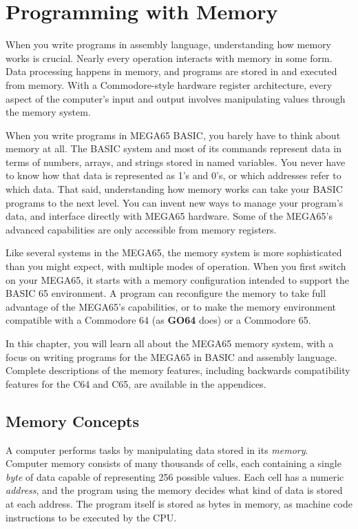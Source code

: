 
\chapter{Programming with Memory}
\label{cha:programming-with-memory}

When you write programs in assembly language, understanding how memory works is crucial. Nearly every operation interacts with memory in some form. Data processing happens in memory, and programs are stored in and executed from memory. With a Commodore-style hardware register architecture, every aspect of the computer's input and output involves manipulating values through the memory system.

When you write programs in MEGA65 BASIC, you barely have to think about memory at all. The BASIC system and most of its commands represent data in terms of numbers, arrays, and strings stored in named variables. You never have to know how that data is represented as 1's and 0's, or which addresses refer to which data. That said, understanding how memory works can take your BASIC programs to the next level. You can invent new ways to manage your program's data, and interface directly with MEGA65 hardware. Some of the MEGA65's advanced capabilities are only accessible from memory registers.

Like several systems in the MEGA65, the memory system is more sophisticated than you might expect, with multiple modes of operation. When you first switch on your MEGA65, it starts with a memory configuration intended to support the BASIC 65 environment. A program can reconfigure the memory to take full advantage of the MEGA65's capabilities, or to make the memory environment compatible with a Commodore 64 (as \textbf{GO64} does) or a Commodore 65.

In this chapter, you will learn all about the MEGA65 memory system, with a focus on writing programs for the MEGA65 in BASIC and assembly language. Complete descriptions of the memory features, including backwards compatibility features for the C64 and C65, are available in the appendices.

\newpage
\section{Memory Concepts}
\label{sec:programming-with-memory-concepts}

A computer performs tasks by manipulating data stored in its {\em memory}. Computer memory consists of many thousands of cells, each containing a single {\em byte} of data capable of representing 256 possible values. Each cell has a numeric {\em address}, and the program using the memory decides what kind of data is stored at each address. The program itself is stored as bytes in memory, as machine code instructions to be executed by the CPU.

